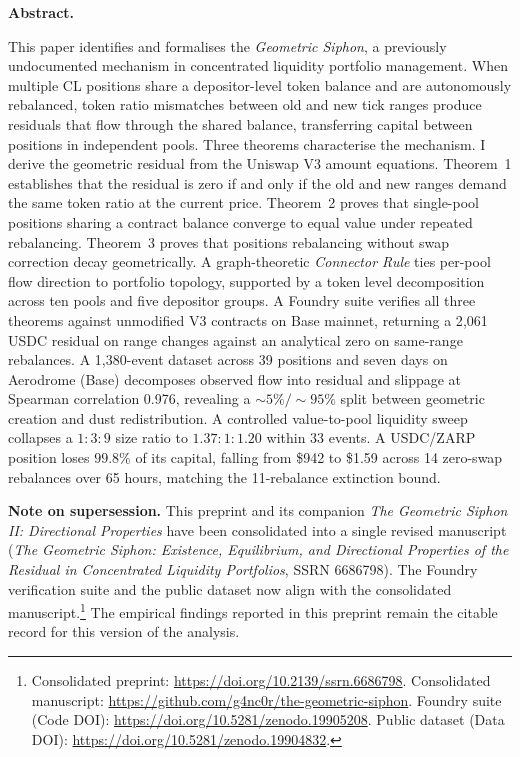 \documentclass[11pt,a4paper]{article}
\renewenvironment{abstract}{%
  \fontsize{10pt}{13pt}\selectfont
  \begin{list}{}{%
    \setlength{\leftmargin}{0.5in}%
    \setlength{\rightmargin}{0.5in}%
    \setlength{\listparindent}{0pt}%
    \setlength{\parsep}{6pt plus 2pt minus 1pt}%
    \setlength{\topsep}{0pt}%
    \setlength{\partopsep}{0pt}%
  }\item[]\noindent\textbf{Abstract.}\hspace{0.5em}\ignorespaces
}{\end{list}}
\begin{document}
\begin{abstract}
This paper identifies and formalises the \emph{Geometric Siphon}, a previously undocumented mechanism in concentrated liquidity portfolio management. When multiple CL positions share a depositor-level token balance and are autonomously rebalanced, token ratio mismatches between old and new tick ranges produce residuals that flow through the shared balance, transferring capital between positions in independent pools. Three theorems characterise the mechanism. I derive the geometric residual from the Uniswap V3 amount equations. Theorem~1 establishes that the residual is zero if and only if the old and new ranges demand the same token ratio at the current price. Theorem~2 proves that single-pool positions sharing a contract balance converge to equal value under repeated rebalancing. Theorem~3 proves that positions rebalancing without swap correction decay geometrically. A graph-theoretic \emph{Connector Rule} ties per-pool flow direction to portfolio topology, supported by a token level decomposition across ten pools and five depositor groups. A Foundry suite verifies all three theorems against unmodified V3 contracts on Base mainnet, returning a 2{,}061 USDC residual on range changes against an analytical zero on same-range rebalances. A 1{,}380-event dataset across 39 positions and seven days on Aerodrome (Base) decomposes observed flow into residual and slippage at Spearman correlation 0.976, revealing a ${\sim}5\%/{\sim}95\%$ split between geometric creation and dust redistribution. A controlled value-to-pool liquidity sweep collapses a $1{:}3{:}9$ size ratio to $1.37{:}1{:}1.20$ within 33 events. A USDC/ZARP position loses $99.8\%$ of its capital, falling from \$942 to \$1.59 across 14 zero-swap rebalances over 65 hours, matching the 11-rebalance extinction bound.
\end{abstract}

\vspace{24pt}

\begin{list}{}{%
  \setlength{\leftmargin}{0.5in}%
  \setlength{\rightmargin}{0.5in}%
  \setlength{\listparindent}{0pt}%
  \setlength{\topsep}{0pt}%
  \setlength{\partopsep}{0pt}%
}\item[]\fontsize{10pt}{13pt}\selectfont\noindent\textbf{Note on supersession.} This preprint and its companion \emph{The Geometric Siphon II: Directional Properties} have been consolidated into a single revised manuscript (\emph{The Geometric Siphon: Existence, Equilibrium, and Directional Properties of the Residual in Concentrated Liquidity Portfolios}, SSRN 6686798). The Foundry verification suite and the public dataset now align with the consolidated manuscript.\footnote{Consolidated preprint: \url{https://doi.org/10.2139/ssrn.6686798}. Consolidated manuscript: \url{https://github.com/g4nc0r/the-geometric-siphon}. Foundry suite (Code DOI): \url{https://doi.org/10.5281/zenodo.19905208}. Public dataset (Data DOI): \url{https://doi.org/10.5281/zenodo.19904832}.} The empirical findings reported in this preprint remain the citable record for this version of the analysis.\end{list}
\end{document}
